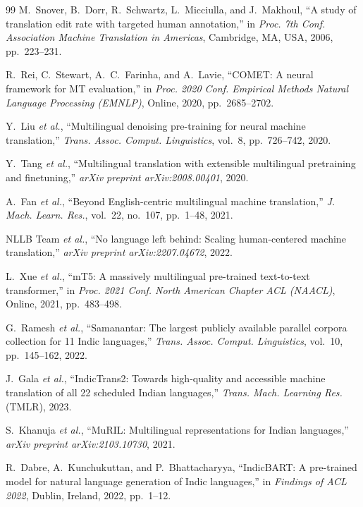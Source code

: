 \documentclass[conference]{IEEEtran}
\begin{document}
\begin{thebibliography}{99}
M.~Snover, B.~Dorr, R.~Schwartz, L.~Micciulla, and J.~Makhoul,
``A study of translation edit rate with targeted human annotation,''
in \emph{Proc. 7th Conf. Association Machine Translation in Americas},
Cambridge, MA, USA, 2006, pp.~223--231.

R.~Rei, C.~Stewart, A.~C.~Farinha, and A.~Lavie,
``COMET: A neural framework for MT evaluation,''
in \emph{Proc. 2020 Conf. Empirical Methods Natural Language Processing
(EMNLP)},
Online, 2020, pp.~2685--2702.

Y.~Liu \textit{et al.},
``Multilingual denoising pre-training for neural machine translation,''
\emph{Trans. Assoc. Comput. Linguistics}, vol.~8, pp.~726--742, 2020.

Y.~Tang \textit{et al.},
``Multilingual translation with extensible multilingual pretraining and
finetuning,''
\textit{arXiv preprint arXiv:2008.00401}, 2020.

A.~Fan \textit{et al.},
``Beyond English-centric multilingual machine translation,''
\emph{J. Mach. Learn. Res.}, vol.~22, no.~107, pp.~1--48, 2021.

NLLB Team \textit{et al.},
``No language left behind: Scaling human-centered machine translation,''
\textit{arXiv preprint arXiv:2207.04672}, 2022.

L.~Xue \textit{et al.},
``mT5: A massively multilingual pre-trained text-to-text transformer,''
in \emph{Proc. 2021 Conf. North American Chapter ACL (NAACL)},
Online, 2021, pp.~483--498.

G.~Ramesh \textit{et al.},
``Samanantar: The largest publicly available parallel corpora collection
for 11 Indic languages,''
\emph{Trans. Assoc. Comput. Linguistics}, vol.~10, pp.~145--162, 2022.

J.~Gala \textit{et al.},
``IndicTrans2: Towards high-quality and accessible machine translation of
all 22 scheduled Indian languages,''
\emph{Trans. Mach. Learning Res.} (TMLR), 2023.

S.~Khanuja \textit{et al.},
``MuRIL: Multilingual representations for Indian languages,''
\textit{arXiv preprint arXiv:2103.10730}, 2021.

R.~Dabre, A.~Kunchukuttan, and P.~Bhattacharyya,
``IndicBART: A pre-trained model for natural language generation of
Indic languages,''
in \emph{Findings of ACL 2022},
Dublin, Ireland, 2022, pp.~1--12.


\end{thebibliography}
\end{document}
